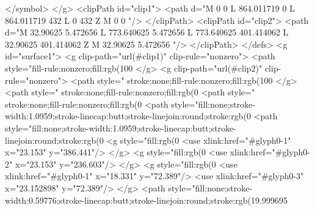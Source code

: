 </symbol>
</g>
<clipPath id="clip1">
  <path d="M 0 0 L 864.011719 0 L 864.011719 432 L 0 432 Z M 0 0 "/>
</clipPath>
<clipPath id="clip2">
  <path d="M 32.90625 5.472656 L 773.640625 5.472656 L 773.640625 401.414062 L 32.90625 401.414062 Z M 32.90625 5.472656 "/>
</clipPath>
</defs>
<g id="surface1">
<g clip-path="url(#clip1)" clip-rule="nonzero">
<path style="fill-rule:nonzero;fill:rgb(100%
</g>
<g clip-path="url(#clip2)" clip-rule="nonzero">
<path style=" stroke:none;fill-rule:nonzero;fill:rgb(100%
</g>
<path style=" stroke:none;fill-rule:nonzero;fill:rgb(0%
<path style=" stroke:none;fill-rule:nonzero;fill:rgb(0%
<path style="fill:none;stroke-width:1.0959;stroke-linecap:butt;stroke-linejoin:round;stroke:rgb(0%
<path style="fill:none;stroke-width:1.0959;stroke-linecap:butt;stroke-linejoin:round;stroke:rgb(0%
<g style="fill:rgb(0%
  <use xlink:href="#glyph0-1" x="23.153" y="386.441"/>
</g>
<g style="fill:rgb(0%
  <use xlink:href="#glyph0-2" x="23.153" y="236.603"/>
</g>
<g style="fill:rgb(0%
  <use xlink:href="#glyph0-1" x="18.331" y="72.389"/>
  <use xlink:href="#glyph0-3" x="23.152898" y="72.389"/>
</g>
<path style="fill:none;stroke-width:0.59776;stroke-linecap:butt;stroke-linejoin:round;stroke:rgb(19.999695%
